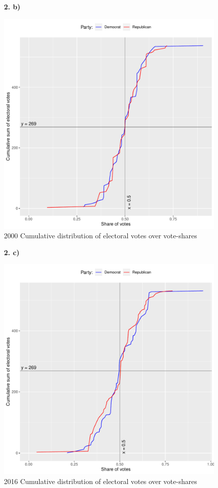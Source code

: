 \documentclass[12pt, letterpaper]{article}
\begin{document}
\begin{figure}[!ht]
\textbf{2. b)}\par\medskip
\caption*{2000 Cumulative distribution of electoral votes over vote-shares}
\includegraphics[scale=0.9]{cdf_2b.pdf}
\end{figure}

\begin{figure}[!ht]
\textbf{2. c)}\par\medskip
\caption*{2016 Cumulative distribution of electoral votes over vote-shares}
\includegraphics[scale=0.9]{cdf_2c.pdf}
\end{figure}
\end{document}
